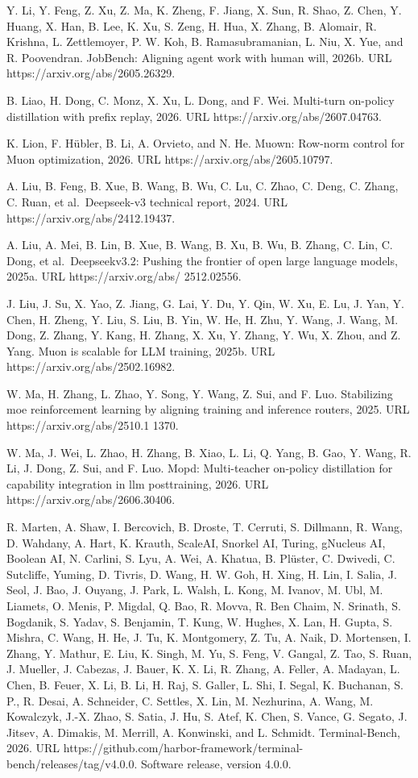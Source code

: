 \documentclass[
  10
]{article}
\begin{document}
Y. Li, Y. Feng, Z. Xu, Z. Ma, K. Zheng, F. Jiang, X. Sun, R. Shao, Z.
Chen, Y. Huang, X. Han, B. Lee, K. Xu, S. Zeng, H. Hua, X. Zhang, B.
Alomair, R. Krishna, L. Zettlemoyer, P. W. Koh, B. Ramasubramanian, L.
Niu, X. Yue, and R. Poovendran. JobBench: Aligning agent work with human
will, 2026b. URL https://arxiv.org/abs/2605.26329.

B. Liao, H. Dong, C. Monz, X. Xu, L. Dong, and F. Wei. Multi-turn
on-policy distillation with prefix replay, 2026. URL
https://arxiv.org/abs/2607.04763.

K. Lion, F. Hübler, B. Li, A. Orvieto, and N. He. Muown: Row-norm
control for Muon optimization, 2026. URL
https://arxiv.org/abs/2605.10797.



A. Liu, B. Feng, B. Xue, B. Wang, B. Wu, C. Lu, C. Zhao, C. Deng, C.
Zhang, C. Ruan, et al.~Deepseek-v3 technical report, 2024. URL
https://arxiv.org/abs/2412.19437.

A. Liu, A. Mei, B. Lin, B. Xue, B. Wang, B. Xu, B. Wu, B. Zhang, C. Lin,
C. Dong, et al.~Deepseekv3.2: Pushing the frontier of open large
language models, 2025a. URL https://arxiv.org/abs/ 2512.02556.

J. Liu, J. Su, X. Yao, Z. Jiang, G. Lai, Y. Du, Y. Qin, W. Xu, E. Lu, J.
Yan, Y. Chen, H. Zheng, Y. Liu, S. Liu, B. Yin, W. He, H. Zhu, Y. Wang,
J. Wang, M. Dong, Z. Zhang, Y. Kang, H. Zhang, X. Xu, Y. Zhang, Y. Wu,
X. Zhou, and Z. Yang. Muon is scalable for LLM training, 2025b. URL
https://arxiv.org/abs/2502.16982.

W. Ma, H. Zhang, L. Zhao, Y. Song, Y. Wang, Z. Sui, and F. Luo.
Stabilizing moe reinforcement learning by aligning training and
inference routers, 2025. URL https://arxiv.org/abs/2510.1 1370.

W. Ma, J. Wei, L. Zhao, H. Zhang, B. Xiao, L. Li, Q. Yang, B. Gao, Y.
Wang, R. Li, J. Dong, Z. Sui, and F. Luo. Mopd: Multi-teacher on-policy
distillation for capability integration in llm posttraining, 2026. URL
https://arxiv.org/abs/2606.30406.

R. Marten, A. Shaw, I. Bercovich, B. Droste, T. Cerruti, S. Dillmann, R.
Wang, D. Wahdany, A. Hart, K. Krauth, ScaleAI, Snorkel AI, Turing,
gNucleus AI, Boolean AI, N. Carlini, S. Lyu, A. Wei, A. Khatua, B.
Plüster, C. Dwivedi, C. Sutcliffe, Yuming, D. Tivris, D. Wang, H. W. Goh,
H. Xing, H. Lin, I. Salia, J. Seol, J. Bao, J. Ouyang, J. Park, L.
Walsh, L. Kong, M. Ivanov, M. Ubl, M. Liamets, O. Menis, P. Migdal, Q.
Bao, R. Movva, R. Ben Chaim, N. Srinath, S. Bogdanik, S. Yadav, S.
Benjamin, T. Kung, W. Hughes, X. Lan, H. Gupta, S. Mishra, C. Wang, H.
He, J. Tu, K. Montgomery, Z. Tu, A. Naik, D. Mortensen, I. Zhang, Y.
Mathur, E. Liu, K. Singh, M. Yu, S. Feng, V. Gangal, Z. Tao, S. Ruan, J.
Mueller, J. Cabezas, J. Bauer, K. X. Li, R. Zhang, A. Feller, A.
Madayan, L. Chen, B. Feuer, X. Li, B. Li, H. Raj, S. Galler, L. Shi, I.
Segal, K. Buchanan, S. P., R. Desai, A. Schneider, C. Settles, X. Lin,
M. Nezhurina, A. Wang, M. Kowalczyk, J.-X. Zhao, S. Satia, J. Hu, S.
Atef, K. Chen, S. Vance, G. Segato, J. Jitsev, A. Dimakis, M. Merrill,
A. Konwinski, and L. Schmidt. Terminal-Bench, 2026. URL
https://github.com/harbor-framework/terminal-bench/releases/tag/v4.0.0.
Software release, version 4.0.0.
\end{document}
